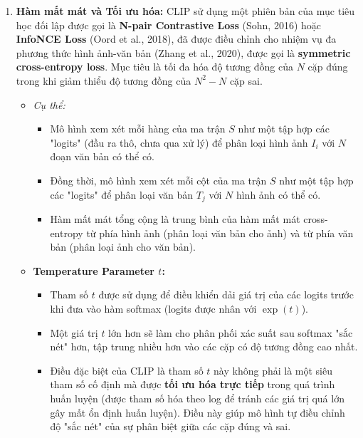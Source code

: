 \begin{enumerate}
    \item \textbf{Hàm mất mát và Tối ưu hóa:}
            CLIP sử dụng một phiên bản của mục tiêu học đối lập được gọi là \textbf{N-pair Contrastive Loss} (Sohn, 2016) hoặc \textbf{InfoNCE Loss} (Oord et al., 2018), đã được điều chỉnh cho nhiệm vụ đa phương thức hình ảnh-văn bản (Zhang et al., 2020), được gọi là \textbf{symmetric cross-entropy loss}. Mục tiêu là tối đa hóa độ tương đồng của $N$ cặp đúng trong khi giảm thiểu độ tương đồng của $N^2 - N$ cặp sai.
    \begin{itemize}
        \item \textit{Cụ thể:}
        \begin{itemize}
            \item Mô hình xem xét mỗi hàng của ma trận $S$ như một tập hợp các "logits" (đầu ra thô, chưa qua xử lý) để phân loại hình ảnh $I_i$ với $N$ đoạn văn bản có thể có.
            \item Đồng thời, mô hình xem xét mỗi cột của ma trận $S$ như một tập hợp các "logits" để phân loại văn bản $T_j$ với $N$ hình ảnh có thể có.
            \item Hàm mất mát tổng cộng là trung bình của hàm mất mát cross-entropy từ phía hình ảnh (phân loại văn bản cho ảnh) và từ phía văn bản (phân loại ảnh cho văn bản).
        \end{itemize}
        \item \textbf{Temperature Parameter $t$:}
        \begin{itemize}
            \item Tham số $t$ được sử dụng để điều khiển dải giá trị của các logits trước khi đưa vào hàm softmax (logits được nhân với $\exp(t)$).
            \item Một giá trị $t$ lớn hơn sẽ làm cho phân phối xác suất sau softmax "sắc nét" hơn, tập trung nhiều hơn vào các cặp có độ tương đồng cao nhất.
            \item Điều đặc biệt của CLIP là tham số $t$ này không phải là một siêu tham số cố định mà được \textbf{tối ưu hóa trực tiếp} trong quá trình huấn luyện (được tham số hóa theo log để tránh các giá trị quá lớn gây mất ổn định huấn luyện). Điều này giúp mô hình tự điều chỉnh độ "sắc nét" của sự phân biệt giữa các cặp đúng và sai.
        \end{itemize}
    \end{itemize}
\end{enumerate}

